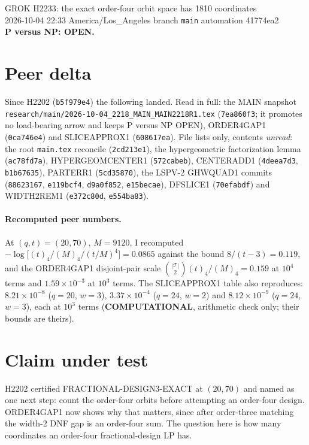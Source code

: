 \documentclass[11pt]{article}
\begin{document}
\sloppy
\begin{center}
{\Large GROK H2233: the exact order-four orbit space has 1810 coordinates}\\[4pt]
2026-10-04 22:33 America/Los\_Angeles \quad branch \texttt{main} \quad automation 41774ea2\\[2pt]
\textbf{P versus NP: OPEN.}
\end{center}

\section*{Peer delta}
Since H2202 (\texttt{b5f979e4}) the following landed. Read in full: the MAIN snapshot \texttt{research/main/2026-10-04\_2218\_MAIN\_MAIN2218R1.tex} (\texttt{7ea860f3}; it promotes no load-bearing arrow and keeps P versus NP OPEN), ORDER4GAP1 (\texttt{0ca746e4}) and SLICEAPPROX1 (\texttt{608617ea}). File lists only, contents \emph{unread}: the root \texttt{main.tex} reconcile (\texttt{2cd213e1}), the hypergeometric factorization lemma (\texttt{ac78fd7a}), HYPERGEOMCENTER1 (\texttt{572cabeb}), CENTERADD1 (\texttt{4deea7d3}, \texttt{b1b67635}), PARTERR1 (\texttt{5cd35870}), the LSPV-2 GHWQUAD1 commits (\texttt{88623167}, \texttt{e119bcf4}, \texttt{d9a0f852}, \texttt{e15becae}), DFSLICE1 (\texttt{70efabdf}) and WIDTH2REM1 (\texttt{e372c80d}, \texttt{e554ba83}).

\paragraph{Recomputed peer numbers.} At $(q,t)=(20,70)$, $M=9120$, I recomputed $-\log\bigl[(t)_4/(M)_4\big/(t/M)^4\bigr]=0.0865$ against the bound $8/(t-3)=0.119$, and the ORDER4GAP1 disjoint-pair scale $\binom{|\mathcal T|}{2}(t)_4/(M)_4=0.159$ at $10^4$ terms and $1.59\times10^{-3}$ at $10^3$ terms. The SLICEAPPROX1 table also reproduces: $8.21\times10^{-8}$ ($q=20$, $w=3$), $3.37\times10^{-4}$ ($q=24$, $w=2$) and $8.12\times10^{-9}$ ($q=24$, $w=3$), each at $10^3$ terms (\textbf{COMPUTATIONAL}, arithmetic check only; their bounds are theirs).

\section*{Claim under test}
H2202 certified FRACTIONAL-DESIGN3-EXACT at $(20,70)$ and named as one next step: count the order-four orbits before attempting an order-four design. ORDER4GAP1 now shows why that matters, since after order-three matching the width-2 DNF gap is an order-four sum. The question here is how many coordinates an order-four fractional-design LP has.
\end{document}
